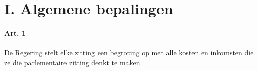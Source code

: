 \hypertarget{i.-algemene-bepalingen}{%
\section{I. Algemene bepalingen}\label{i.-algemene-bepalingen}}

\hypertarget{art.-1}{%
\paragraph{Art. 1}\label{art.-1}}

De Regering stelt elke zitting een begroting op met alle kosten en
inkomsten die ze die parlementaire zitting denkt te maken.
